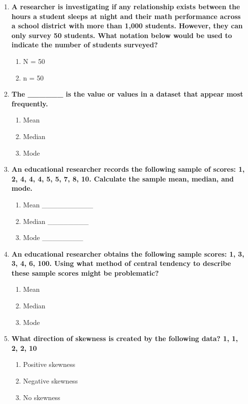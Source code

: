 \documentclass[
  letterpaper,
  DIV=11,
  numbers=noendperiod]{scrreprt}
\begin{document}
\begin{enumerate}
\def\labelenumi{\arabic{enumi}.}
\item
  \textbf{A researcher is investigating if any relationship exists
  between the hours a student sleeps at night and their math performance
  across a school district with more than 1,000 students. However, they
  can only survey 50 students. What notation below would be used to
  indicate the number of students surveyed?}

  \begin{enumerate}
  \def\labelenumii{\alph{enumii}.}
  \item
    N = 50
  \item
    n = 50
  \end{enumerate}
\item
  \textbf{The \_\_\_\_\_\_ is the value or values in a dataset that
  appear most frequently.}

  \begin{enumerate}
  \def\labelenumii{\alph{enumii}.}
  \item
    Mean
  \item
    Median
  \item
    Mode
  \end{enumerate}
\item
  \textbf{An educational researcher records the following sample of
  scores: 1, 2, 4, 4, 4, 5, 5, 7, 8, 10. Calculate the sample mean,
  median, and mode.}

  \begin{enumerate}
  \def\labelenumii{\alph{enumii}.}
  \item
    Mean \_\_\_\_\_\_\_\_\_\_
  \item
    Median \_\_\_\_\_\_\_\_
  \item
    Mode \_\_\_\_\_\_\_\_
  \end{enumerate}
\item
  \textbf{An educational researcher obtains the following sample scores:
  1, 3, 3, 4, 6, 100. Using what method of central tendency to describe
  these sample scores might be problematic?}

  \begin{enumerate}
  \def\labelenumii{\alph{enumii}.}
  \item
    Mean
  \item
    Median
  \item
    Mode
  \end{enumerate}
\item
  \textbf{What direction of skewness is created by the following data?
  1, 1, 2, 2, 10}

  \begin{enumerate}
  \def\labelenumii{\alph{enumii}.}
  \item
    Positive skewness
  \item
    Negative skewness
  \item
    No skewness
  \end{enumerate}
\end{enumerate}
\end{document}
